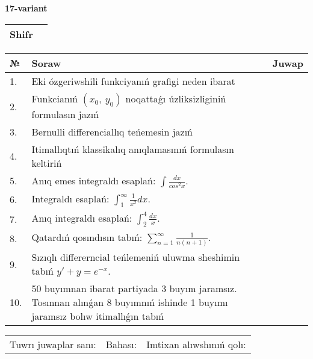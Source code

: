\documentclass{article}
\begin{document}
  \egroup
  
  \newpage
  
  
  \textbf{17-variant}\\
  
  \bgroup
  \def\arraystretch{1.6} %
  
  \begin{tabular}{|m{5.7cm}|m{9.5cm}|}
  \hline
  Shifr & \\
  \hline
  \end{tabular}
  
  \vspace{1cm}
  
  \begin{tabular}{|m{0.7cm}|m{10cm}|m{4cm}|}
  \hline
  № & Soraw & Juwap \\
  \hline
  1. & Eki ózgeriwshili funkciyanıń grafigi neden ibarat &  \\
  \hline
  2. & Funkcianıń \((x_{0},\ y_{0})\) noqattaǵı úzliksizliginiń formulasın jazıń &  \\
  \hline
  3. & Bernulli differenciallıq teńemesin jazıń &  \\
  \hline
  4. & Itimallıqtıń klassikalıq anıqlamasınıń formulasın keltiriń &  \\
  \hline
  5. & Anıq emes integraldı esaplań: \(\int\frac{dx}{cos^2 x}\). &  \\
  \hline
  6. & Integraldı esaplań: \(\int_{1}^{\infty}{\frac{1}{x^2 }dx}\). &  \\
  \hline
  7. & Anıq integraldı esaplań: \(\int_{2}^{4}\frac{dx}{x}\). &  \\
  \hline
  8. & Qatardıń qosındısın tabıń: \(\sum_{n = 1}^{\infty}\frac{1}{n(n + 1)}\). &  \\
  \hline
  9. & Sızıqlı differerncial teńlemeniń uluwma sheshimin tabıń \(y' + y = e^{- x}\). &  \\
  \hline
  10. & 50 buyımnan ibarat partiyada 3 buyım jaramsız. Tosınnan alınǵan 8 buyımnıń ishinde 1 buyımı jaramsız bolıw itimallıǵın tabıń &  \\
  \hline
  \end{tabular}
  
  \vspace{1cm}
  
  \begin{tabular}{lll}
  Tuwrı juwaplar sanı: \underline{\hspace{1.5cm}} & 
  Bahası: \underline{\hspace{1.5cm}} & 
  Imtixan alıwshınıń qolı: \underline{\hspace{2cm}} \\
  \end{tabular}
  
\end{document}

